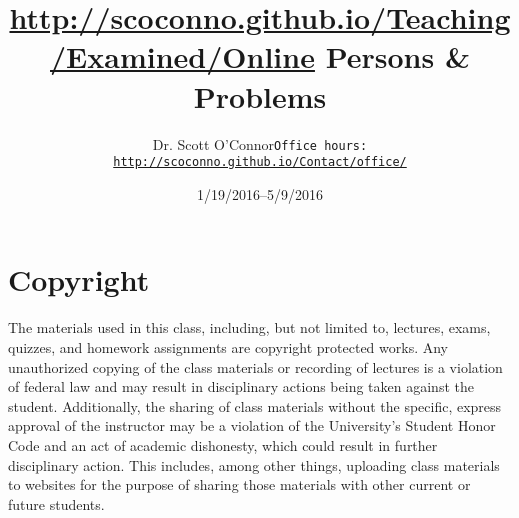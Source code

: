 \documentclass[article,oneside]{memoir}
\def\myauthor{Author}
\def\mytitle{Title}
\def\mycopyright{\myauthor}
\def\myweb{\href{http://scoconno.github.io/Teaching/Examined/Online}{http://scoconno.github.io/Teaching/Examined/Online}}
\def\myauthor{Dr. Scott O'Connor}
\def\mytitle{{\normalsize \myweb \newline} \HUGE Persons \& Problems}
\begin{document}
\setsansfont[Mapping=tex-text]{Myriad Pro} 
\setmonofont[Mapping=tex-text,Scale=0.8]{Georgia} 

\def\ind{\hangindent=1 true cm\hangafter=1 \noindent}
\def\labelitemi{$\cdot$}


\title{\LARGE \mytitle}     
\author{\Large\myauthor \newline \footnotesize\texttt{\noindent Office hours: \href{http://scoconno.github.io/Contact/Office/}{http://scoconno.github.io/Contact/office/}}}
\date{1/19/2016--5/9/2016}


\maketitle




%
%

\section{Copyright}
The materials used in this class, including, but not limited to, lectures, exams, quizzes, and homework assignments are copyright protected works.  Any unauthorized copying of the class materials or recording of lectures is a violation of federal law and may result in disciplinary actions being taken against the student.  Additionally, the sharing of class materials without the specific, express approval of the instructor may be a violation of the University's Student Honor Code and an act of academic dishonesty, which could result in further disciplinary action.  This includes, among other things, uploading class materials to websites for the purpose of sharing those materials with other current or future students. 
\end{document}
